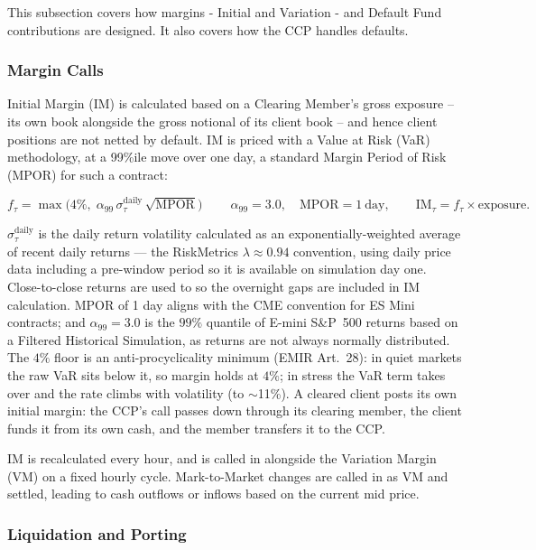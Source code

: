 This subsection covers how margins - Initial and Variation - and Default Fund contributions are designed. It also covers how the CCP handles defaults. 

\subsubsection{Margin Calls}

Initial Margin (IM) is calculated based on a Clearing Member's gross exposure -- its own book alongside the gross notional of its client book -- and hence client positions are not netted by default. IM is priced with a Value at Risk (VaR) methodology, at a 99\%ile move over one day, a standard Margin Period of Risk (MPOR) for such a contract:

\begin{equation}
\label{eq:im}
f_\tau =  \max\!\bigl(4\%,\; \alpha_{99}\,\sigma^{\mathrm{daily}}_\tau\,\sqrt{\mathrm{MPOR}}\bigr)\
\qquad \alpha_{99} = 3.0,\quad \mathrm{MPOR} = 1\ \text{day},
\qquad \mathrm{IM}_\tau = f_\tau \times \text{exposure}.
\end{equation}

 $\sigma^{\mathrm{daily}}_\tau$ is the daily return volatility calculated as an
exponentially-weighted average of recent daily returns --- the RiskMetrics
$\lambda\approx0.94$ convention, using daily price data including a pre-window period so it is available on simulation day one. Close-to-close returns are used to so the overnight gaps are included in IM calculation. MPOR of 1 day aligns with the CME convention for ES Mini contracts; and $\alpha_{99}=3.0$ is the
$99\%$ quantile of E-mini S\&P~500 returns based on a Filtered Historical Simulation, as returns are not always normally distributed. The $4\%$ floor is an anti-procyclicality minimum (EMIR Art.~28): in quiet markets the
raw VaR sits below it, so margin holds at $4\%$; in stress the VaR term takes over and the rate climbs
with volatility (to $\sim$11\%).  A cleared client
posts its own initial margin: the CCP's call passes down through its clearing member, the client
funds it from its own cash, and the member transfers it to the CCP.

IM is recalculated every hour, and is called in alongside the Variation Margin (VM) on a fixed hourly cycle. Mark-to-Market changes are called in as VM and settled, leading to cash outflows or inflows based on the current mid price. 

\subsubsection{Liquidation and Porting}


